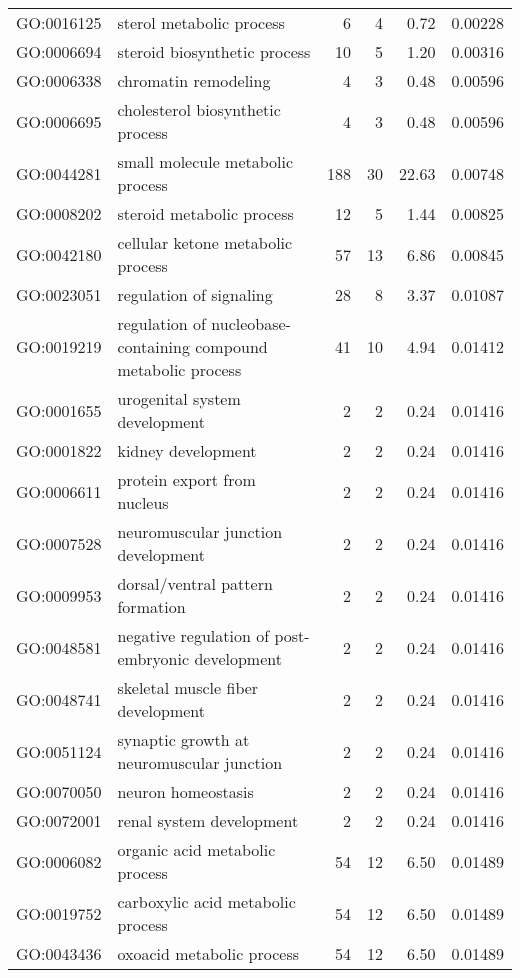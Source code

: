 \begin{longtable}{lp{4.5cm}rrrl}
  GO:0016125 & sterol metabolic process &   6 &   4 & 0.72 & 0.00228 \\ 
  GO:0006694 & steroid biosynthetic process &  10 &   5 & 1.20 & 0.00316 \\ 
  GO:0006338 & chromatin remodeling &   4 &   3 & 0.48 & 0.00596 \\ 
  GO:0006695 & cholesterol biosynthetic process &   4 &   3 & 0.48 & 0.00596 \\ 
  GO:0044281 & small molecule metabolic process & 188 &  30 & 22.63 & 0.00748 \\ 
  GO:0008202 & steroid metabolic process &  12 &   5 & 1.44 & 0.00825 \\ 
  GO:0042180 & cellular ketone metabolic process &  57 &  13 & 6.86 & 0.00845 \\ 
  GO:0023051 & regulation of signaling &  28 &   8 & 3.37 & 0.01087 \\ 
  GO:0019219 & regulation of nucleobase-containing compound metabolic process &  41 &  10 & 4.94 & 0.01412 \\ 
  GO:0001655 & urogenital system development &   2 &   2 & 0.24 & 0.01416 \\ 
  GO:0001822 & kidney development &   2 &   2 & 0.24 & 0.01416 \\ 
  GO:0006611 & protein export from nucleus &   2 &   2 & 0.24 & 0.01416 \\ 
  GO:0007528 & neuromuscular junction development &   2 &   2 & 0.24 & 0.01416 \\ 
  GO:0009953 & dorsal/ventral pattern formation &   2 &   2 & 0.24 & 0.01416 \\ 
  GO:0048581 & negative regulation of post-embryonic development &   2 &   2 & 0.24 & 0.01416 \\ 
  GO:0048741 & skeletal muscle fiber development &   2 &   2 & 0.24 & 0.01416 \\ 
  GO:0051124 & synaptic growth at neuromuscular junction &   2 &   2 & 0.24 & 0.01416 \\ 
  GO:0070050 & neuron homeostasis &   2 &   2 & 0.24 & 0.01416 \\ 
  GO:0072001 & renal system development &   2 &   2 & 0.24 & 0.01416 \\ 
  GO:0006082 & organic acid metabolic process &  54 &  12 & 6.50 & 0.01489 \\ 
  GO:0019752 & carboxylic acid metabolic process &  54 &  12 & 6.50 & 0.01489 \\ 
  GO:0043436 & oxoacid metabolic process &  54 &  12 & 6.50 & 0.01489 \\ 

\end{longtable}
